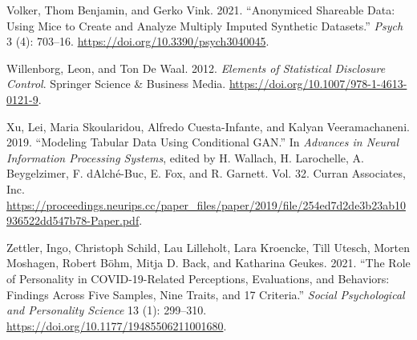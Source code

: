 \documentclass[
]{article}
\newlength{\cslhangindent}
\newlength{\cslentryspacingunit} %
\newenvironment{CSLReferences}[2] %
 {%
  \setlength{\parindent}{0pt}
  \ifodd #1
  \let\oldpar\par
  \def\par{\hangindent=\cslhangindent\oldpar}
  \fi
  \setlength{\parskip}{#2\cslentryspacingunit}
 }%
 {}
\begin{document}
\begin{CSLReferences}{1}{0}
\leavevmode{}%
Volker, Thom Benjamin, and Gerko Vink. 2021. {``Anonymiced Shareable
Data: Using Mice to Create and Analyze Multiply Imputed Synthetic
Datasets.''} \emph{Psych} 3 (4): 703--16.
\url{https://doi.org/10.3390/psych3040045}.

\leavevmode{}%
Willenborg, Leon, and Ton De Waal. 2012. \emph{Elements of Statistical
Disclosure Control}. Springer Science \& Business Media.
\url{https://doi.org/10.1007/978-1-4613-0121-9}.

\leavevmode{}%
Xu, Lei, Maria Skoularidou, Alfredo Cuesta-Infante, and Kalyan
Veeramachaneni. 2019. {``Modeling Tabular Data Using Conditional GAN.''}
In \emph{Advances in Neural Information Processing Systems}, edited by
H. Wallach, H. Larochelle, A. Beygelzimer, F. dAlché-Buc, E. Fox, and R.
Garnett. Vol. 32. Curran Associates, Inc.
\url{https://proceedings.neurips.cc/paper_files/paper/2019/file/254ed7d2de3b23ab10936522dd547b78-Paper.pdf}.

\leavevmode{}%
Zettler, Ingo, Christoph Schild, Lau Lilleholt, Lara Kroencke, Till
Utesch, Morten Moshagen, Robert Böhm, Mitja D. Back, and Katharina
Geukes. 2021. {``The Role of Personality in COVID-19-Related
Perceptions, Evaluations, and Behaviors: Findings Across Five Samples,
Nine Traits, and 17 Criteria.''} \emph{Social Psychological and
Personality Science} 13 (1): 299--310.
\url{https://doi.org/10.1177/19485506211001680}.

\end{CSLReferences}
\end{document}
